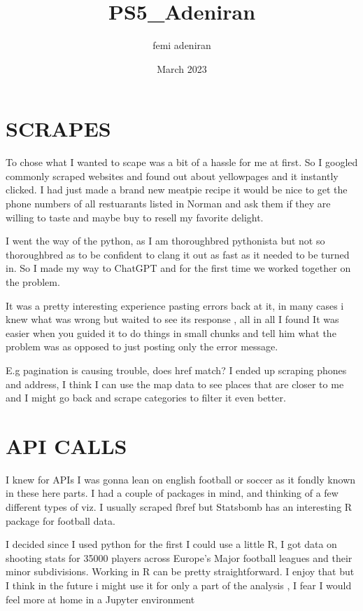 \documentclass{article}
\title{PS5_Adeniran}
\author{femi adeniran}
\date{March 2023}
\begin{document}
\maketitle

\section{SCRAPES }
To chose what I wanted to scape was a bit of a hassle for me at first. So I googled commonly scraped websites and found out about yellowpages and it instantly clicked. I had just made a brand new meatpie recipe it would be nice to get the phone numbers of all restuarants listed in Norman and ask them if they are willing to taste and maybe buy to resell my favorite delight.

I went the way of the python, as I am thoroughbred pythonista but not so thoroughbred as to be confident to clang it out as fast as it needed to be turned in. So I made my way to ChatGPT and for the first time we worked together on the problem. 

It was a pretty interesting experience pasting errors back at it, in many cases i knew what was wrong but waited to see its response , all in all I found It was easier when you guided it to do things in small chunks and tell him what the problem was as opposed to just posting only the error message. 

E.g pagination is causing trouble, does href match? 
I ended up scraping phones and address, I think I can use the map data to see places that are closer to me and I might go back and scrape categories to filter it even better.
\section{ API CALLS}
 I knew for APIs I was gonna lean on english football or soccer as it fondly known in these here parts. I had a couple of packages in mind, and thinking of a few different types of viz. I usually scraped fbref but Statsbomb has an interesting R package for football data. 

I decided since I used python for the first I could use a little R, I got data on shooting stats for 35000 players across Europe's Major football leagues and their minor subdivisions.
Working in R can be pretty straightforward. I enjoy that but I think in the future i might use it for only a part of the analysis , I fear I would feel more at home in a Jupyter environment
\end{document}
